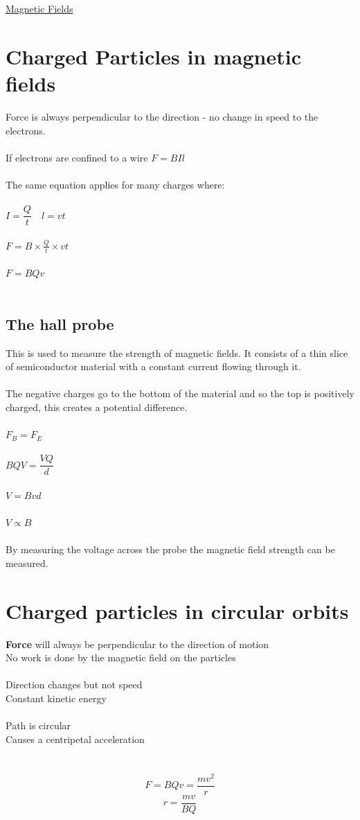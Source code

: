 \documentclass{article}[18pt]
\begin{document}
\begin{center}
\underline{\huge Magnetic Fields}
\end{center}
\section{Charged Particles in magnetic fields}
Force is always perpendicular to the direction - no change in speed to the electrons.\\
\\
If electrons are confined to a wire $F=BIl$\\
\\
The same equation applies for many charges where:\\
\\
$I=\dfrac{Q}{t} \quad l=vt$\\
\\
$F=B\times\frac{Q}{t}\times vt$\\
\\
$F=BQv$\\
\\
\subsection{The hall probe}
This is used to measure the strength of magnetic fields. It consists of a thin slice of semiconductor material with a constant current flowing through it.\\
\\
The negative charges go to the bottom of the material and so the top is positively charged, this creates a potential difference.\\
\\
$F_B=F_E$\\
\\
$BQV=\dfrac{VQ}{d}$\\
\\
$V=Bvd$\\
\\
$V\propto B$\\
\\
By measuring the voltage across the probe the magnetic field strength can be measured.
\section{Charged particles in circular orbits}
\textbf{Force} will always be perpendicular to the direction of motion\\
No work is done by the magnetic field on the particles\\
\\
Direction changes but not speed\\
Constant kinetic energy\\
\\
Path is circular\\
Causes a centripetal acceleration\\
\\
\\
$$F=BQv=\dfrac{mv^2}{r}$$
$$r=\dfrac{mv}{BQ}$$
\newpage
\end{document}
